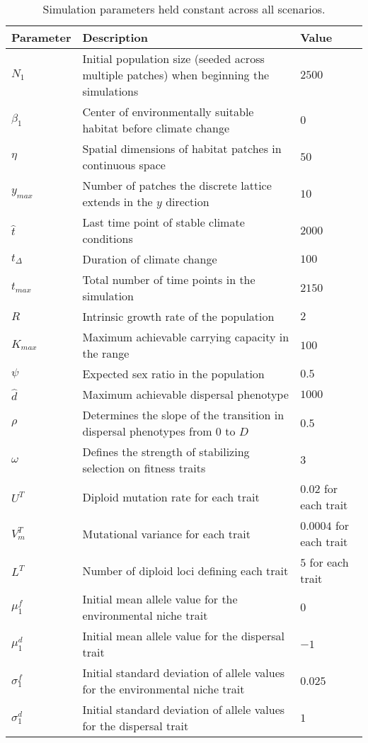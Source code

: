 \documentclass[12pt, oneside]{article}
\begin{document}
\begin{table}
\renewcommand{\arraystretch}{1.5}
  \begin{tabular}{ p{2cm} | p{8cm} | p{2cm} }
    \hline
    Parameter & Description & Value \\ \hline \hline
    $N_{1}$ & Initial population size (seeded across multiple patches) when beginning the simulations & $2500$ \\
    $\beta_{1}$ & Center of environmentally suitable habitat before climate change & $0$ \\
    $\eta$ & Spatial dimensions of habitat patches in continuous space & $50$ \\
    $y_{max}$ & Number of patches the discrete lattice extends in the $y$ direction & $10$ \\
    $\hat{t}$ & Last time point of stable climate conditions & $2000$ \\
    $t_{\Delta}$ & Duration of climate change & $100$ \\
    $t_{max}$ & Total number of time points in the simulation & $2150$ \\
    $R$ & Intrinsic growth rate of the population & $2$ \\
    $K_{max}$ & Maximum achievable carrying capacity in the range & $100$ \\ 
    $\psi$ & Expected sex ratio in the population & $0.5$ \\
    $\hat{d}$ & Maximum achievable dispersal phenotype & $1000$ \\
    $\rho$ & Determines the slope of the transition in dispersal phenotypes from $0$ to $D$ & $0.5$ \\
    $\omega$ & Defines the strength of stabilizing selection on fitness traits & $3$ \\
    $U^{T}$ & Diploid mutation rate for each trait & $0.02$ for each trait \\
    $V_{m}^{T}$ & Mutational variance for each trait & $0.0004$ for each trait \\
    $L^{T}$ & Number of diploid loci defining each trait & $5$ for each trait \\
    $\mu_{1}^{f}$ & Initial mean allele value for the environmental niche trait & $0$ \\
    $\mu_{1}^{d}$ & Initial mean allele value for the dispersal trait & $-1$ \\
    $\sigma_{1}^{f}$ & Initial standard deviation of allele values for the environmental niche trait & $0.025$ \\
    $\sigma_{1}^{d}$ & Initial standard deviation of allele values for the dispersal trait & $1$ \\
    \hline
  \end{tabular}
\caption[LoF entry]{Simulation parameters held constant across all scenarios.}
\label{table:ConstPars}
\end{table}
\end{document}
